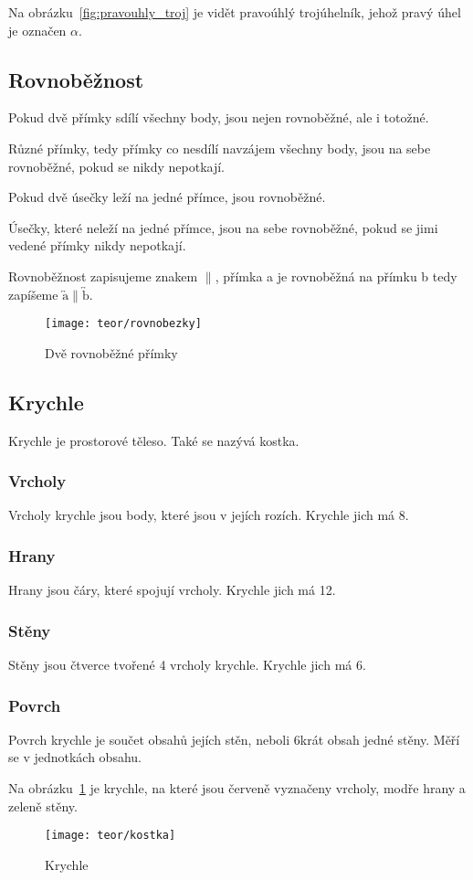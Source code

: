 Na obrázku~\ref{fig:pravouhly_troj} je vidět pravoúhlý trojúhelník, jehož pravý úhel je označen $\alpha$.

\subsection{Rovnoběžnost}
Pokud dvě přímky sdílí všechny body, jsou nejen rovnoběžné, ale i totožné.

Různé přímky, tedy přímky co nesdílí navzájem všechny body, jsou na sebe rovnoběžné, pokud se nikdy nepotkají.

Pokud dvě úsečky leží na jedné přímce, jsou rovnoběžné.

Úsečky, které neleží na jedné přímce, jsou na sebe rovnoběžné, pokud se jimi vedené přímky nikdy nepotkají.

Rovnoběžnost zapisujeme znakem $\|$, přímka a je rovnoběžná na přímku b tedy zapíšeme $\overleftrightarrow{\text{a}} \| \overleftrightarrow{\text{b}}$.
\begin{figure}[h]
    \centering
    \texttt{[image: teor/rovnobezky]}
    \caption{Dvě rovnoběžné přímky}
\end{figure}
\FloatBarrier

\subsection{Krychle}
Krychle je prostorové těleso. Také se nazývá kostka.

\subsubsection{Vrcholy}
Vrcholy krychle jsou body, které jsou v jejích rozích. Krychle jich má 8.

\subsubsection{Hrany}
Hrany jsou čáry, které spojují vrcholy. Krychle jich má 12.

\subsubsection{Stěny}
Stěny jsou čtverce tvořené 4 vrcholy krychle. Krychle jich má 6.

\subsubsection{Povrch}
Povrch krychle je součet obsahů jejích stěn, neboli 6krát obsah jedné stěny. Měří se v jednotkách obsahu.

Na obrázku~\ref{fig:krychle} je krychle, na které jsou červeně vyznačeny vrcholy, modře hrany a zeleně stěny.

\begin{figure}[h]
    \centering
    \texttt{[image: teor/kostka]}
    \caption{Krychle}
    \label{fig:krychle}
\end{figure}


